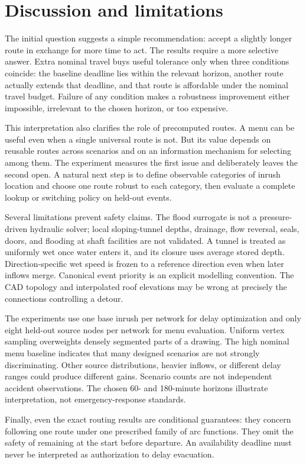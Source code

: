\documentclass[11pt]{article}
\begin{document}
\section{Discussion and limitations}
The initial question suggests a simple recommendation: accept a slightly longer route in exchange for more time to act. The results require a more selective answer. Extra nominal travel buys useful tolerance only when three conditions coincide: the baseline deadline lies within the relevant horizon, another route actually extends that deadline, and that route is affordable under the nominal travel budget. Failure of any condition makes a robustness improvement either impossible, irrelevant to the chosen horizon, or too expensive.

This interpretation also clarifies the role of precomputed routes. A menu can be useful even when a single universal route is not. But its value depends on reusable routes across scenarios and on an information mechanism for selecting among them. The experiment measures the first issue and deliberately leaves the second open. A natural next step is to define observable categories of inrush location and choose one route robust to each category, then evaluate a complete lookup or switching policy on held-out events.

Several limitations prevent safety claims. The flood surrogate is not a pressure-driven hydraulic solver; local sloping-tunnel depths, drainage, flow reversal, seals, doors, and flooding at shaft facilities are not validated. A tunnel is treated as uniformly wet once water enters it, and its closure uses average stored depth. Direction-specific wet speed is frozen to a reference direction even when later inflows merge. Canonical event priority is an explicit modelling convention. The CAD topology and interpolated roof elevations may be wrong at precisely the connections controlling a detour.

The experiments use one base inrush per network for delay optimization and only eight held-out source nodes per network for menu evaluation. Uniform vertex sampling overweights densely segmented parts of a drawing. The high nominal menu baseline indicates that many designed scenarios are not strongly discriminating. Other source distributions, heavier inflows, or different delay ranges could produce different gains. Scenario counts are not independent accident observations. The chosen 60- and 180-minute horizons illustrate interpretation, not emergency-response standards.

Finally, even the exact routing results are conditional guarantees: they concern following one route under one prescribed family of arc functions. They omit the safety of remaining at the start before departure. An availability deadline must never be interpreted as authorization to delay evacuation.
\end{document}
